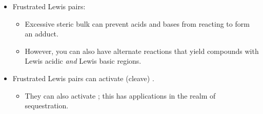 \documentclass[../notes.tex]{subfiles}
\begin{document}
\begin{itemize}
\begin{itemize}
    \end{itemize}
    \item Frustrated Lewis pairs:
    \begin{itemize}
        \item Excessive steric bulk can prevent acids and bases from reacting to form an adduct.
        \item However, you can also have alternate reactions that yield compounds with Lewis acidic \emph{and} Lewis basic regions.
    \end{itemize}
    \item Frustrated Lewis pairs can activate (cleave) .
    \begin{itemize}
        \item They can also activate ; this has applications in the realm of  sequestration.
    \end{itemize}
\end{itemize}
\end{document}
